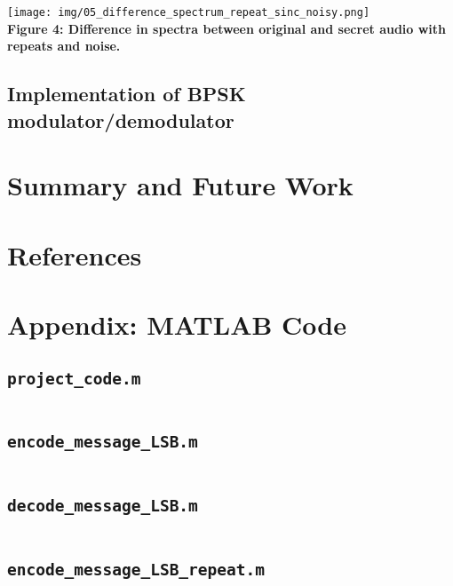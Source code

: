 \documentclass{article}
\begin{document}
\begin{center}
  \texttt{[image: img/05\_difference\_spectrum\_repeat\_sinc\_noisy.png]} \\
  \textbf{Figure 4: Difference in spectra between original and secret audio with repeats and noise.}
\end{center}

\subsection{Implementation of BPSK modulator/demodulator}

\section{Summary and Future Work}

\section{References}

\newpage
\section{Appendix: MATLAB Code}
\subsection{\texttt{project\_code.m}}
\inputminted[xleftmargin=24pt, linenos=true, breaklines]{matlab}{project_code.m}

\subsection{\texttt{encode\_message\_LSB.m}}
\inputminted[xleftmargin=24pt, linenos=true, breaklines]{matlab}{src/encode_message_LSB.m}

\subsection{\texttt{decode\_message\_LSB.m}}
\inputminted[xleftmargin=24pt, linenos=true, breaklines]{matlab}{src/decode_message_LSB.m}

\subsection{\texttt{encode\_message\_LSB\_repeat.m}}
\inputminted[xleftmargin=24pt, linenos=true, breaklines]{matlab}{src/encode_message_LSB_repeat.m}
\end{document}
